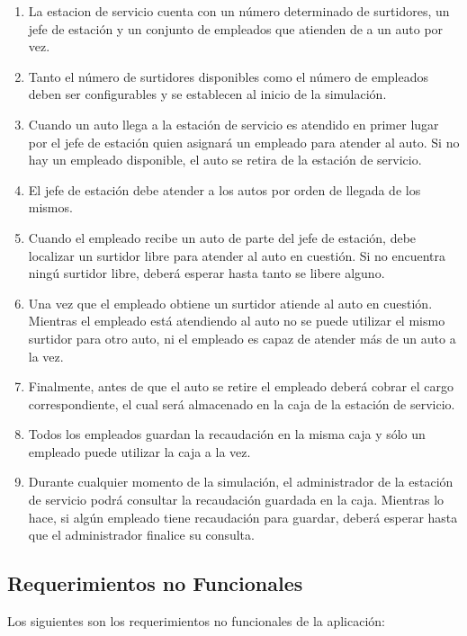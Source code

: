 \documentclass[12pt,a4paper,titlepage,oneside]{article}
\begin{document}
\begin{enumerate}
\item 
La estacion de servicio cuenta con un número determinado de surtidores, un jefe de estación y un conjunto de empleados que atienden de a un auto por vez.
\item 
Tanto el número de surtidores disponibles como el número de empleados deben ser configurables y se establecen al inicio de la simulación.
\item
Cuando un auto llega a la estación de servicio es atendido en primer lugar por el jefe de estación quien asignará un empleado para atender al auto. Si no hay un empleado disponible, el auto se retira de la estación de servicio.
\item
El jefe de estación debe atender a los autos por orden de llegada de los mismos.
\item
Cuando el empleado recibe un auto de parte del jefe de estación, debe localizar un surtidor libre para atender al auto en cuestión. Si no encuentra ningú surtidor libre, deberá esperar hasta tanto se libere alguno.
\item
Una vez que el empleado obtiene un surtidor atiende al auto en cuestión. Mientras el empleado está atendiendo al auto no se puede utilizar el mismo surtidor para otro auto, ni el empleado es capaz de atender más de un auto a la vez.
\item
Finalmente, antes de que el auto se retire el empleado deberá cobrar el cargo correspondiente, el cual será almacenado en la caja de la estación de servicio.
\item
Todos los empleados guardan la recaudación en la misma caja y sólo un empleado puede utilizar la caja a la vez.
\item
Durante cualquier momento de la simulación, el administrador de la estación de servicio podrá consultar la recaudación guardada en la caja. Mientras lo hace, si algún empleado tiene recaudación para guardar, deberá esperar hasta que el administrador finalice su consulta.
\end{enumerate}

 
\subsection{Requerimientos no Funcionales}

Los siguientes son los requerimientos no funcionales de la aplicación:
\end{document}
